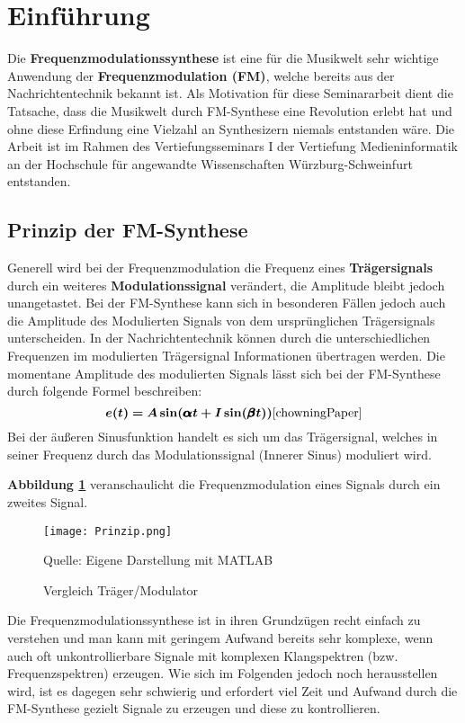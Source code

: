 \newpage
\section{Einführung}
Die \textbf{Frequenzmodulationssynthese} ist eine für die Musikwelt sehr wichtige Anwendung der \textbf{Frequenzmodulation (FM)}, welche bereits aus der Nachrichtentechnik bekannt ist. Als Motivation für diese Seminararbeit dient die Tatsache, dass die Musikwelt durch FM-Synthese eine Revolution erlebt hat und ohne diese Erfindung eine Vielzahl an Synthesizern niemals entstanden wäre. Die Arbeit ist im Rahmen des Vertiefungsseminars I der Vertiefung Medieninformatik an der Hochschule für angewandte Wissenschaften Würzburg-Schweinfurt entstanden. %
\FloatBarrier
\subsection{Prinzip der FM-Synthese}
\label{PrinzipFM}
Generell wird bei der Frequenzmodulation die Frequenz eines \textbf{Trägersignals} durch ein weiteres \textbf{Modulationssignal} verändert, die Amplitude bleibt jedoch unangetastet. Bei der FM-Synthese kann sich in besonderen Fällen jedoch auch die Amplitude des Modulierten Signals von dem ursprünglichen Trägersignals unterscheiden. In der Nachrichtentechnik können durch die unterschiedlichen Frequenzen im modulierten Trägersignal Informationen übertragen werden. 
Die momentane Amplitude des modulierten Signals lässt sich bei der FM-Synthese durch folgende Formel beschreiben:
\[
\bm{e(t) = A\sin(\pmb{\alpha} t + I\sin(\pmb{\beta} t))} \cite{chowningPaper}
\]
Bei der äußeren Sinusfunktion handelt es sich um das Trägersignal, welches in seiner Frequenz durch das Modulationssignal (Innerer Sinus) moduliert wird.

\textbf{Abbildung \ref{fig:vergleichSignale}} veranschaulicht die Frequenzmodulation eines Signals durch ein zweites Signal.

\begin{figure} [ht]
\centering
  \texttt{[image: Prinzip.png]}
\caption{Vergleich Träger/Modulator}
\label{fig:vergleichSignale}
Quelle: Eigene Darstellung mit MATLAB
\end{figure}
\FloatBarrier
Die Frequenzmodulationssynthese ist in ihren Grundzügen recht einfach zu verstehen und man kann mit geringem Aufwand bereits sehr komplexe, wenn auch oft unkontrollierbare Signale mit komplexen Klangspektren (bzw. Frequenzspektren) erzeugen. Wie sich im Folgenden jedoch noch herausstellen wird, ist es dagegen sehr schwierig und erfordert viel Zeit und Aufwand durch die FM-Synthese gezielt Signale zu erzeugen und diese zu kontrollieren.

